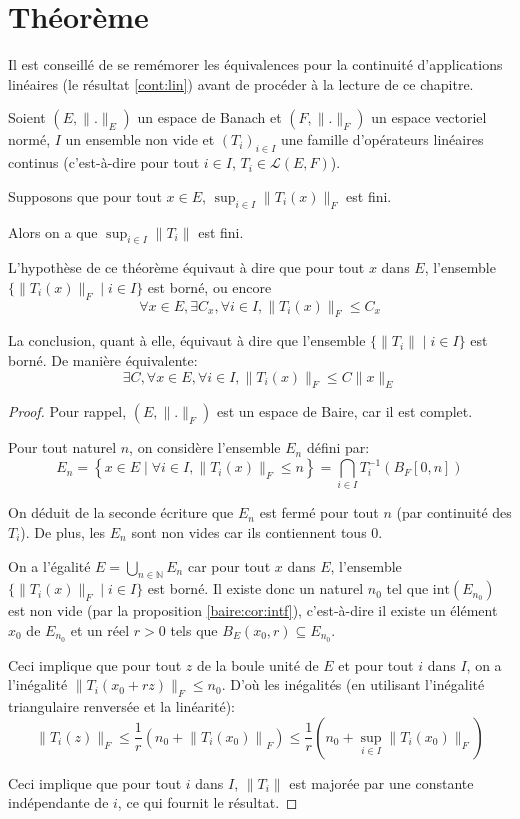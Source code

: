 \section{Théorème}

Il est conseillé de se remémorer les équivalences pour
la continuité d'applications linéaires (le résultat
\ref{cont:lin}) avant de procéder à la lecture de ce
chapitre.


\begin{thm}
  Soient $(E, \|.\|_E)$ un espace de Banach
  et $(F, \|.\|_F)$ un espace vectoriel normé,
  $I$ un ensemble non vide et $(T_i)_{i\in I}$ une famille d'opérateurs
  linéaires continus (c'est-à-dire pour tout $i\in I$,
  $T_i\in \mathscr{L}(E, F)$).

  Supposons que pour tout $x\in E$, $\sup_{i\in I}\|T_i(x)\|_F$ est fini.

  Alors on a que $\sup_{i\in I}\|T_i\|$ est fini.
\end{thm}

L'hypothèse de ce théorème équivaut à dire que pour tout $x$ dans $E$,
l'ensemble $\{\|T_i(x)\|_F\mid i\in I\}$ est borné, ou encore
$$\forall x\in E, \exists C_x, \forall i\in I, \|T_i(x)\|_F \leq C_x$$

La conclusion, quant à elle, équivaut à dire que l'ensemble
$\{\|T_i\|\mid i\in I\}$ est borné. De manière équivalente:
$$\exists C, \forall x\in E, \forall i\in I, \|T_i(x)\|_F\leq C\|x\|_E$$

\begin{proof}
  Pour rappel, $(E, \|.\|_F)$ est un espace de Baire, car il est complet.

  Pour tout naturel $n$, on considère l'ensemble $E_n$ défini par:
  $$E_n = \left\{x\in E\mid \forall i\in I, \|T_i(x)\|_F\leq n\right\}
  =\bigcap_{i\in I}T_i^{-1}(B_F[0, n])$$

  On déduit de la seconde écriture que $E_n$ est
  fermé pour tout $n$ (par continuité des $T_i$). De plus,
  les $E_n$ sont non vides car ils contiennent tous $0$.

  On a l'égalité $E = \bigcup_{n\in\mathbb N}E_n$ car pour tout
  $x$ dans $E$, l'ensemble $\{\|T_i(x)\|_F\mid i\in I\}$ est borné.
  Il existe donc un naturel $n_0$ tel que $\mathrm{int}(E_{n_0})$
  est non vide (par la proposition \ref{baire:cor:intf}),
  c'est-à-dire il existe
  un élément $x_0$ de $E_{n_0}$ et un réel $r>0$ tels que $B_E(x_0, r)
  \subseteq E_{n_0}$.

  Ceci implique que pour tout $z$ de la boule unité de $E$ et
  pour tout $i$ dans $I$, on a l'inégalité
  $\|T_i(x_0 + r z)\|_F\leq n_0$. D'où les inégalités (en utilisant
  l'inégalité triangulaire renversée et la linéarité):
  $$\|T_i(z)\|_F \leq \frac 1 r \left( n_0 + \left\|T_i (x_0)\right\|_F \right) \leq
  \frac{1}{r} \left( n_0 + \sup_{i\in I}\|T_i(x_0)\|_F \right)$$

  Ceci implique que pour tout $i$ dans $I$, $\|T_i\|$ est
  majorée par une constante indépendante de $i$, ce qui
  fournit le résultat.

\end{proof}

